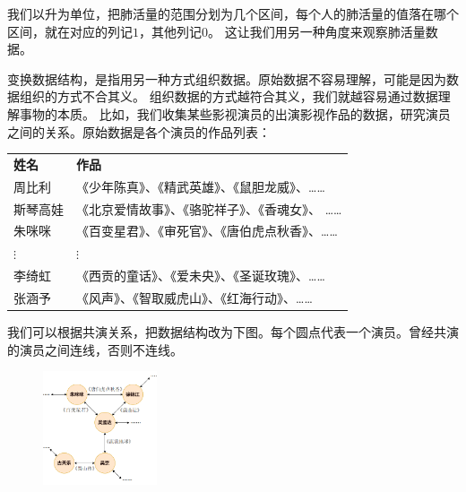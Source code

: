 \documentclass[12pt,UTF8]{ctexbook}
\begin{document}
我们以升为单位，把肺活量的范围分划为几个区间，每个人的肺活量的值落在哪个区间，就在对应的列记$1$，其他列记$0$。
这让我们用另一种角度来观察肺活量数据。

变换数据结构，是指用另一种方式组织数据。原始数据不容易理解，可能是因为数据组织的方式不合其义。
组织数据的方式越符合其义，我们就越容易通过数据理解事物的本质。
比如，我们收集某些影视演员的出演影视作品的数据，研究演员之间的关系。原始数据是各个演员的作品列表：
\begin{center}
    \begin{tabular}{ p{4em}<{\centering} !{\color{white} \vrule width 2pt} p{22em}<{\centering} }
         \textbf{姓名} & \textbf{作品} \\ [0.5ex] 
         周比利 & 《少年陈真》、《精武英雄》、《鼠胆龙威》、…… \\  
         斯琴高娃 & 《北京爱情故事》、《骆驼祥子》、《香魂女》、 …… \\  
         朱咪咪 & 《百变星君》、《审死官》、《唐伯虎点秋香》、…… \\  
         $\vdots$ & $\vdots$ \\  
         李绮虹 & 《西贡的童话》、《爱未央》、《圣诞玫瑰》、…… \\  
         张涵予 & 《风声》、《智取威虎山》、《红海行动》、…… \\  
    \end{tabular}
\end{center}

我们可以根据共演关系，把数据结构改为下图。每个圆点代表一个演员。曾经共演的演员之间连线，否则不连线。
\begin{figure}[H] %
    \vspace{8pt}
    \centering
    \includegraphics[width=0.3\textwidth]{演员关系图1.png}
\end{figure}
\end{document}
